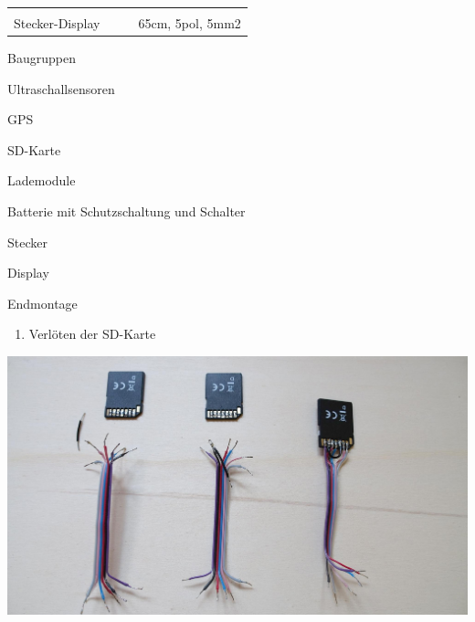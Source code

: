 \documentclass[
]{article}
\providecommand{\tightlist}{%
  \setlength{\itemsep}{0pt}\setlength{\parskip}{0pt}}
\begin{document}
\begin{longtable}[]{@{}llll@{}}
\begin{minipage}[t]{0.22\columnwidth}
{}\strut
\end{minipage}\tabularnewline
\begin{minipage}[t]{0.22\columnwidth}\raggedright
{Stecker-Display}\strut
\end{minipage} & \begin{minipage}[t]{0.22\columnwidth}\raggedright
{}\strut
\end{minipage} & \begin{minipage}[t]{0.22\columnwidth}\raggedright
{}\strut
\end{minipage} & \begin{minipage}[t]{0.22\columnwidth}\raggedright
{65cm, 5pol, 5mm}{2}\strut
\end{minipage}\tabularnewline
\bottomrule
\end{longtable}

{}

{}

{}

{Baugruppen}

{Ultraschallsensoren}

{GPS}

{SD-Karte}

{Lademodule}

{Batterie mit Schutzschaltung und Schalter}

{Stecker}

{Display}

{}

{Endmontage}

{}

{}

{}

{}

{}

{}

{}

{}

{}

{}

{}

\begin{enumerate}
\tightlist
\item
  {Verlöten der SD-Karte}
\end{enumerate}

{\includegraphics{images/image4.jpg}}
\end{document}
